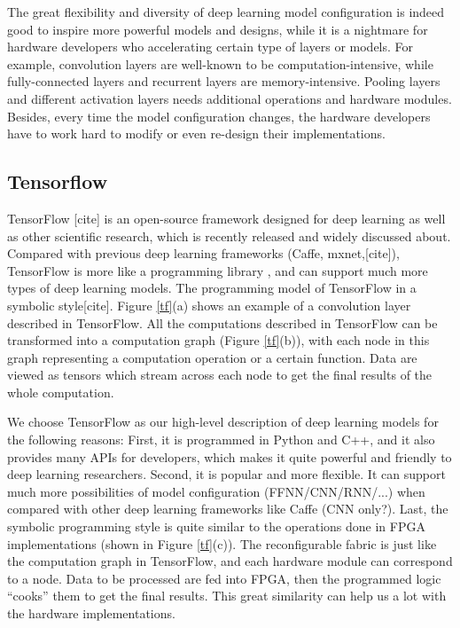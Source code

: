 \documentclass{acm_proc_article-sp-copy}
\begin{document}
The great flexibility and diversity of deep learning model configuration is indeed good to inspire more powerful models and designs, while it is a nightmare for hardware developers who accelerating certain type of layers or models. For example, convolution layers are well-known to be computation-intensive, while fully-connected layers and recurrent layers are memory-intensive. Pooling layers and different activation layers needs additional operations and hardware modules. Besides, every time the model configuration changes, the hardware developers have to work hard to modify or even re-design their implementations. 

\subsection{Tensorflow}
TensorFlow [cite] is an open-source framework designed for deep learning as well as other scientific research, which is recently released and widely discussed about. Compared with previous deep learning frameworks (Caffe, mxnet,[cite]), TensorFlow is more like a programming library , and can support much more types of deep learning models. The programming model of TensorFlow in a symbolic style[cite]. Figure \ref{tf}(a) shows an example of a convolution layer described in TensorFlow. All the computations described in TensorFlow can be transformed into a computation graph (Figure \ref{tf}(b)), with each node in this graph representing a computation operation or a certain function. Data are viewed as tensors which stream across each node to get the final results of the whole computation. 

We choose TensorFlow as our high-level description of deep learning models for the following reasons: First, it is programmed in Python and C++, and it also provides many APIs for developers, which makes it quite powerful and friendly to deep learning researchers. Second, it is popular and more flexible. It can support much more possibilities of model configuration (FFNN/CNN/RNN/...) when compared with other deep learning frameworks like Caffe (CNN only?). Last, the symbolic programming style is quite similar to the operations done in FPGA implementations (shown in Figure \ref{tf}(c)). The reconfigurable fabric is just like the computation graph in TensorFlow, and each hardware module can correspond to a node. Data to be processed are fed into FPGA, then the programmed logic ``cooks'' them to get the final results. This great similarity can help us a lot with the hardware implementations.
\end{document}
